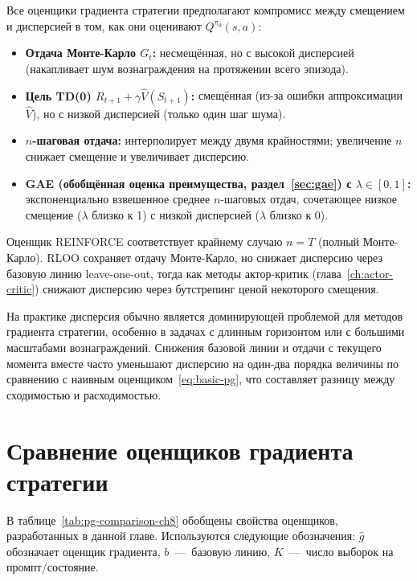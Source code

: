 Все оценщики градиента стратегии предполагают компромисс между смещением и дисперсией в том, как они оценивают $Q^{\pi_\theta}(s,a)$:
\begin{itemize}[leftmargin=*]
\item \textbf{Отдача Монте-Карло $G_t$:} несмещённая, но с высокой дисперсией (накапливает шум вознаграждения на протяжении всего эпизода).
\item \textbf{Цель TD(0) $R_{t+1} + \gamma \hat V(S_{t+1})$:} смещённая (из-за ошибки аппроксимации $\hat V$), но с низкой дисперсией (только один шаг шума).
\item \textbf{$n$-шаговая отдача:} интерполирует между двумя крайностями; увеличение $n$ снижает смещение и увеличивает дисперсию.
\item \textbf{GAE (обобщённая оценка преимущества, раздел~\ref{sec:gae}) с $\lambda \in [0,1]$:} экспоненциально взвешенное среднее $n$-шаговых отдач, сочетающее низкое смещение ($\lambda$ близко к 1) с низкой дисперсией ($\lambda$ близко к 0).
\end{itemize}

Оценщик REINFORCE соответствует крайнему случаю $n = T$ (полный Монте-Карло). RLOO сохраняет отдачу Монте-Карло, но снижает дисперсию через базовую линию leave-one-out, тогда как методы актор-критик (глава~\ref{ch:actor-critic}) снижают дисперсию через бутстрепинг ценой некоторого смещения.

\begin{remark}
\label{rem:variance-dominates}
На практике дисперсия обычно является доминирующей проблемой для методов градиента стратегии, особенно в задачах с длинным горизонтом или с большими масштабами вознаграждений. Снижения базовой линии и отдачи с текущего момента вместе часто уменьшают дисперсию на один-два порядка величины по сравнению с наивным оценщиком~\eqref{eq:basic-pg}, что составляет разницу между сходимостью и расходимостью.
\end{remark}

\section{Сравнение оценщиков градиента стратегии}
\label{sec:pg-comparison}


В таблице~\ref{tab:pg-comparison-ch8} обобщены свойства оценщиков, разработанных в данной главе. Используются следующие обозначения: $\hat g$ обозначает оценщик градиента, $b$ \,---\, базовую линию, $K$ \,---\, число выборок на промпт/состояние.

